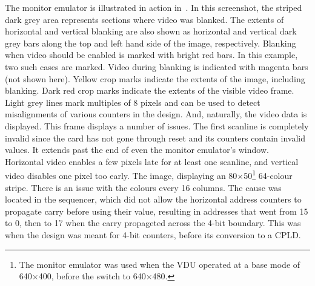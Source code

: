 The monitor emulator is illustrated in action in~. In
this screenshot, the striped dark grey area represents sections where video was
blanked. The extents of horizontal and vertical blanking are also shown as
horizontal and vertical dark grey bars along the top and left hand side of the
image, respectively. Blanking when video should be enabled is marked with
bright red bars. In this example, two such cases are marked. Video during
blanking is indicated with magenta bars (not shown here). Yellow crop marks
indicate the extents of the image, including blanking. Dark red crop marks
indicate the extents of the visible video frame. Light grey lines mark
multiples of 8 pixels and can be used to detect misalignments of various
counters in the design. And, naturally, the video data is displayed. This frame
displays a number of issues. The first scanline is completely invalid since the
card has not gone through reset and its counters contain invalid values. It
extends past the end of even the monitor emulator's window. Horizontal video
enables a few pixels late for at least one scanline, and vertical video
disables one pixel too early. The image, displaying an 80×50\footnote{The
  monitor emulator was used when the VDU operated at a base mode of 640×400,
  before the switch to 640×480.} 64-colour stripe. There is an issue with the
colours every 16 columns. The cause was located in the sequencer, which did not
allow the horizontal address counters to propagate carry before using their
value, resulting in addresses that went from 15 to 0, then to 17 when the carry
propageted across the 4-bit boundary. This was when the design was meant for
4-bit  counters, before its conversion to a CPLD.

